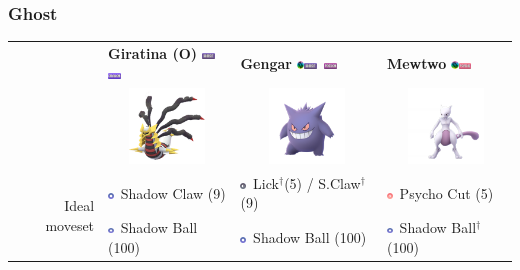 \documentclass[8pt,aspectratio=169,compress]{beamer}
\newcommand{\ghostfull}{\includegraphics[height=0.15cm]{../../images/type/full/Ghost.png}}
\newcommand{\dragonfull}{\includegraphics[height=0.15cm]{../../images/type/full/Dragon.png}}
\newcommand{\psychicfull}{\includegraphics[height=0.15cm]{../../images/type/full/Psychic.png}}
\newcommand{\poisonfull}{\includegraphics[height=0.15cm]{../../images/type/full/Poison.png}}
\newcommand{\darksimp}{\includegraphics[height=0.15cm]{../../images/type/simplified/dark.png}}
\newcommand{\ghostsimp}{\includegraphics[height=0.15cm]{../../images/type/simplified/ghost.png}}
\newcommand{\psysimp}{\includegraphics[height=0.15cm]{../../images/type/simplified/psy.png}}
\newcommand{\megaevol}{\includegraphics[width=0.2cm]{../../images/megaevolve}}
\begin{document}
\begin{frame}
\begin{tiny}
\frametitle{Ghost}

\begin{block}{}
\begin{center}
\begin{tabular}{rp{2cm}p{2cm}p{2cm}} 
    & \textbf{Giratina (O)} \hfill  \ghostfull~\dragonfull&  \textbf{Gengar} \megaevol \hfill \ghostfull~\poisonfull &  \textbf{Mewtwo} \megaevol \hfill \psychicfull \\ 
    &  \multicolumn{1}{c}{\includegraphics[width=2cm]{../../images/pokemon/giratina_o.png}} &   \multicolumn{1}{c}{\includegraphics[width=2cm]{../../images/pokemon/gengar.png} }  &   \multicolumn{1}{c}{\includegraphics[width=2cm]{../../images/pokemon/mewtwo.png} } \\ \hline
\multirow{2}{*}{Ideal moveset}   & \ghostsimp~Shadow Claw (9) & \darksimp~Lick$^{\dag}$(5) / S.Claw$^{\dag}$(9)  & \psysimp~Psycho Cut (5) \\
    &\ghostsimp~Shadow Ball (100) &\ghostsimp~Shadow Ball (100) & \ghostsimp~Shadow Ball$^{\dag}$(100) \\  \hline

\end{tabular}
\end{center}
\end{block}
\end{tiny}
\end{frame}
\end{document}
